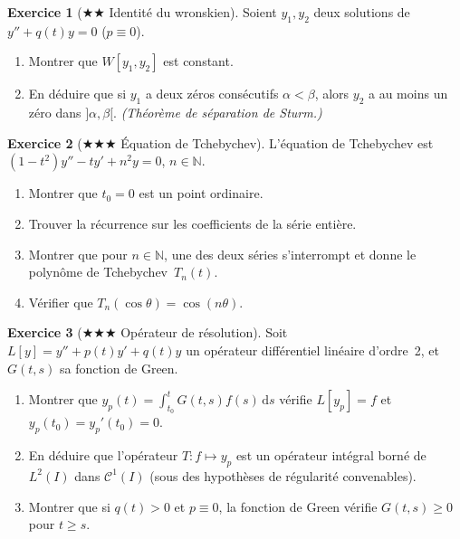 \documentclass[12pt,a4paper,openany]{book}
\theoremstyle{definition}
\newtheorem{exercice}{Exercice}[chapter]
\theoremstyle{plain}
\theoremstyle{remark}
\newcommand{\N}{\mathbb{N}}
\newcommand{\dd}{\mathrm{d}}
\begin{document}
\begin{exercice}[$\bigstar\bigstar$ Identité du wronskien]\label{exo:identite-wronsk}
  Soient $y_1, y_2$ deux solutions de $y'' + q(t)y = 0$ ($p \equiv 0$).
  \begin{enumerate}[label=\alph*)]
    \item Montrer que $W[y_1,y_2]$ est constant.
    \item En déduire que si $y_1$ a deux zéros consécutifs
      $\alpha < \beta$, alors $y_2$ a au moins un zéro dans
      $]\alpha, \beta[$. \emph{(Théorème de séparation de Sturm.)}
  \end{enumerate}
\end{exercice}

\begin{exercice}[$\bigstar\bigstar\bigstar$ Équation de Tchebychev]\label{exo:tchebychev}
  L'équation de Tchebychev est $(1-t^2)y'' - ty' + n^2 y = 0$,
  $n \in \N$.
  \begin{enumerate}[label=\alph*)]
    \item Montrer que $t_0 = 0$ est un point ordinaire.
    \item Trouver la récurrence sur les coefficients de la série entière.
    \item Montrer que pour $n \in \N$, une des deux séries s'interrompt
      et donne le polynôme de Tchebychev~$T_n(t)$.
    \item Vérifier que $T_n(\cos\theta) = \cos(n\theta)$.
  \end{enumerate}
\end{exercice}

\begin{exercice}[$\bigstar\bigstar\bigstar$ Opérateur de résolution]\label{exo:operateur-resol}
  Soit $L[y] = y'' + p(t)y' + q(t)y$ un opérateur différentiel linéaire
  d'ordre~2, et $G(t,s)$ sa fonction de Green.
  \begin{enumerate}[label=\alph*)]
    \item Montrer que $y_p(t) = \int_{t_0}^t G(t,s)f(s)\,\dd s$
      vérifie $L[y_p] = f$ et $y_p(t_0) = y_p'(t_0) = 0$.
    \item En déduire que l'opérateur $T\colon f \mapsto y_p$ est un
      opérateur intégral borné de $L^2(I)$ dans $\mathcal{C}^1(I)$
      (sous des hypothèses de régularité convenables).
    \item Montrer que si $q(t) > 0$ et $p \equiv 0$, la fonction de
      Green vérifie $G(t,s) \geq 0$ pour $t \geq s$.
  \end{enumerate}
\end{exercice}
\end{document}
